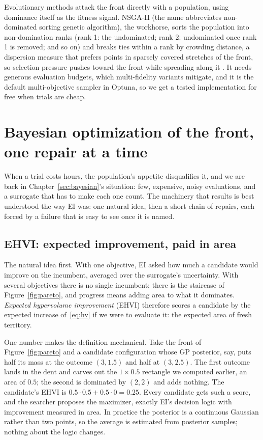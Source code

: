 Evolutionary methods attack the front directly with a population, using
dominance itself as the fitness signal. NSGA-II (the name abbreviates
non-dominated sorting genetic algorithm), the workhorse, sorts the
population into non-domination ranks (rank 1: the undominated; rank 2:
undominated once rank 1 is removed; and so on) and breaks ties within a
rank by crowding distance, a dispersion measure that prefers points in
sparsely covered stretches of the front, so selection pressure pushes
toward the front while spreading along it \citep{deb2002nsga2}. It needs
generous evaluation budgets, which multi-fidelity variants mitigate, and
it is the default multi-objective sampler in Optuna, so we get a tested
implementation for free when trials are cheap.

\section{Bayesian optimization of the front, one repair at a time}
\label{sec:mobo}

When a trial costs hours, the population's appetite disqualifies it,
and we are back in Chapter~\ref{sec:bayesian}'s situation: few,
expensive, noisy evaluations, and a surrogate that has to make each
one count. The machinery that results is best understood the way EI
was: one natural idea, then a short chain of repairs, each forced by
a failure that is easy to see once it is named.

\subsection{EHVI: expected improvement, paid in area}

The natural idea first. With one objective, EI asked how much a
candidate would improve on the incumbent, averaged over the
surrogate's uncertainty. With several objectives there is no single
incumbent; there is the staircase of Figure~\ref{fig:pareto}, and
progress means adding area to what it dominates. \emph{Expected
hypervolume improvement} (EHVI) therefore scores a candidate by the
expected increase of~\eqref{eq:hv} if we were to evaluate it: the
expected area of fresh territory.

One number makes the definition mechanical. Take the front of
Figure~\ref{fig:pareto} and a candidate configuration whose GP
posterior, say, puts half its mass at the outcome $(3, 1.5)$ and half
at $(3, 2.5)$. The first outcome lands in the dent and carves out the
$1 \times 0.5$ rectangle we computed earlier, an area of $0.5$; the
second is dominated by $(2,2)$ and adds nothing. The candidate's EHVI
is $0.5 \cdot 0.5 + 0.5 \cdot 0 = 0.25$. Every candidate gets such a
score, and the searcher proposes the maximizer, exactly EI's decision
logic with improvement measured in area. In practice the posterior is
a continuous Gaussian rather than two points, so the average is
estimated from posterior samples; nothing about the logic changes.

